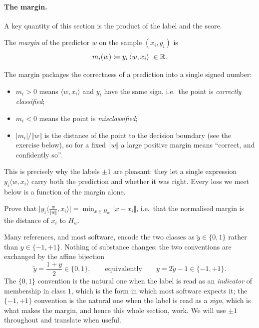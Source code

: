 \paragraph{The margin.}
A key quantity of this section is the product of the label and the score.

\begin{definition}[Margin]
The \emph{margin} of the predictor $w$ on the sample $(x_i, y_i)$ is
\[
m_i(w) \coloneqq y_i \, \langle w, x_i \rangle \ \in \mathbb{R} .
\]
\end{definition}

The margin packages the correctness of a prediction into a single signed number:
\begin{itemize}
    \item $m_i > 0$ means $\langle w, x_i\rangle$ and $y_i$ have the same sign, i.e.\
    the point is \emph{correctly classified};
    \item $m_i < 0$ means the point is \emph{misclassified};
    \item $|m_i| / \Vert w \Vert$ is the distance of the point to the decision
    boundary (see the exercise below), so for a fixed $\Vert w \Vert$ a large
    positive margin means ``correct, and confidently so''.
\end{itemize}
This is precisely why the labels $\pm 1$ are pleasant: they let a single expression
$y_i \langle w, x_i\rangle$ carry both the prediction and whether it was right. Every
loss we meet below is a function of the margin alone.

\begin{exercise}[$\star$]
Prove that $\big| y_i \langle \frac{w}{\Vert w \Vert}, x_i \rangle \big| = \min_{x \in H_w} \Vert x - x_i \Vert$, i.e.\ that the normalised margin is the distance of $x_i$ to $H_w$.
\end{exercise}

\begin{remark}[Labels in $\{0, 1\}$]
Many references, and most software, encode the two classes as $\tilde y \in \{0, 1\}$
rather than $y \in \{-1, +1\}$. Nothing of substance changes: the two conventions are
exchanged by the affine bijection
\[
\tilde y = \frac{1 + y}{2} \in \{0, 1\} ,
\qquad\text{equivalently}\qquad
y = 2 \tilde y - 1 \in \{-1, +1\} .
\]
The $\{0,1\}$ convention is the natural one when the label is read as an
\emph{indicator} of membership in class $1$, which is the form in which most software
expects it; the $\{-1,+1\}$ convention is the natural one when the label is read as a
\emph{sign}, which is what makes the margin, and hence this whole section, work. We
will use $\pm 1$ throughout and translate when useful.
\end{remark}

